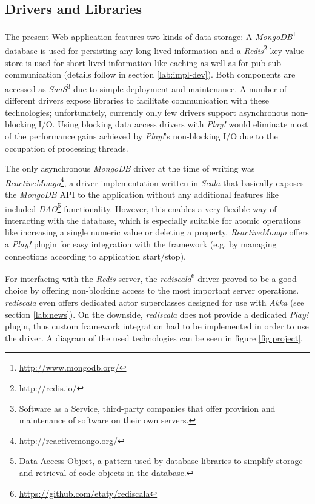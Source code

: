 \subsection{Drivers and Libraries}
The present Web application features two kinds of data storage: A \textit{MongoDB}\footnote{\url{http://www.mongodb.org/}} database is used for persisting any long-lived information and a \textit{Redis}\footnote{\url{http://redis.io/}} key-value store is used for short-lived information like caching as well as for pub-sub communication (details follow in section \ref{lab:impl-dev}). Both components are accessed as \textit{SaaS}\footnote{Software as a Service, third-party companies that offer provision and maintenance of software on their own servers.} due to simple deployment and maintenance. A number of different drivers expose libraries to facilitate communication with these technologies; unfortunately, currently only few drivers support asynchronous non-blocking I/O. Using blocking data access drivers with \textit{Play!} would eliminate most of the performance gains achieved by \textit{Play!}'s non-blocking I/O due to the occupation of processing threads. 

The only asynchronous \textit{MongoDB} driver at the time of writing was \textit{ReactiveMongo}\footnote{\url{http://reactivemongo.org/}}, a driver implementation written in \textit{Scala} that basically exposes the \textit{MongoDB} API to the application without any additional features like included \textit{DAO}\footnote{Data Access Object, a pattern used by database libraries to simplify storage and retrieval of code objects in the database.} functionality. However, this enables a very flexible way of interacting with the database, which is especially suitable for atomic operations like increasing a single numeric value or deleting a property. \textit{ReactiveMongo} offers a \textit{Play!} plugin for easy integration with the framework (e.g. by managing connections according to application start/stop).

For interfacing with the \textit{Redis} server, the \textit{rediscala}\footnote{\url{https://github.com/etaty/rediscala}} driver proved to be a good choice by offering non-blocking access to the most important server operations. \textit{rediscala} even offers dedicated actor superclasses designed for use with \textit{Akka} (see section \ref{lab:news}). On the downside, \textit{rediscala} does not provide a dedicated \textit{Play!} plugin, thus custom framework integration had to be implemented in order to use the driver. A diagram of the used technologies can be seen in figure \ref{fig:project}.


